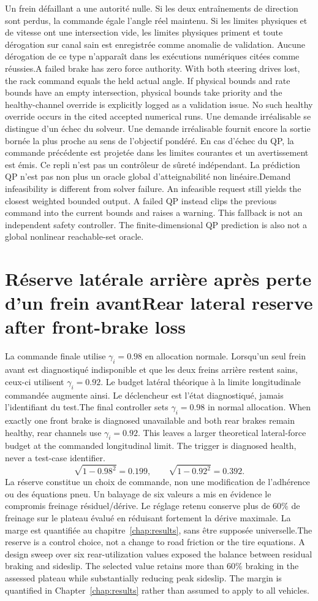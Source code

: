 \documentclass[11pt,a4paper,oneside]{report}
\newcommand{\bi}[2]{\iffrench #2\else #1\fi}
\renewcommand{\sec}[2]{\section{\bi{#1}{#2}}}
\begin{document}
\bi{A failed brake has zero force authority. With both steering drives lost, the rack command equals the held actual angle. If physical bounds and rate bounds have an empty intersection, physical bounds take priority and the healthy-channel override is explicitly logged as a validation issue. No such healthy override occurs in the cited accepted numerical runs.}{Un frein défaillant a une autorité nulle. Si les deux entraînements de direction sont perdus, la commande égale l'angle réel maintenu. Si les limites physiques et de vitesse ont une intersection vide, les limites physiques priment et toute dérogation sur canal sain est enregistrée comme anomalie de validation. Aucune dérogation de ce type n'apparaît dans les exécutions numériques citées comme réussies.}
\bi{Demand infeasibility is different from solver failure. An infeasible request still yields the closest weighted bounded output. A failed QP instead clips the previous command into the current bounds and raises a warning. This fallback is not an independent safety controller. The finite-dimensional QP prediction is also not a global nonlinear reachable-set oracle.}{Une demande irréalisable se distingue d'un échec du solveur. Une demande irréalisable fournit encore la sortie bornée la plus proche au sens de l'objectif pondéré. En cas d'échec du QP, la commande précédente est projetée dans les limites courantes et un avertissement est émis. Ce repli n'est pas un contrôleur de sûreté indépendant. La prédiction QP n'est pas non plus un oracle global d'atteignabilité non linéaire.}

\sec{Rear lateral reserve after front-brake loss}{Réserve latérale arrière après perte d'un frein avant}
\bi{The final controller sets $\gamma_i=0.98$ in normal allocation. When exactly one front brake is diagnosed unavailable and both rear brakes remain healthy, rear channels use $\gamma_i=0.92$. This leaves a larger theoretical lateral-force budget at the commanded longitudinal limit. The trigger is diagnosed health, never a test-case identifier.}{La commande finale utilise $\gamma_i=0.98$ en allocation normale. Lorsqu'un seul frein avant est diagnostiqué indisponible et que les deux freins arrière restent sains, ceux-ci utilisent $\gamma_i=0.92$. Le budget latéral théorique à la limite longitudinale commandée augmente ainsi. Le déclencheur est l'état diagnostiqué, jamais l'identifiant du test.}
\[
\sqrt{1-0.98^2}=0.199,\qquad \sqrt{1-0.92^2}=0.392.
\]
\bi{The reserve is a control choice, not a change to road friction or the tire equations. A design sweep over six rear-utilization values exposed the balance between residual braking and sideslip. The selected value retains more than 60\% braking in the assessed plateau while substantially reducing peak sideslip. The margin is quantified in Chapter~\ref{chap:results} rather than assumed to apply to all vehicles.}{La réserve constitue un choix de commande, non une modification de l'adhérence ou des équations pneu. Un balayage de six valeurs a mis en évidence le compromis freinage résiduel/dérive. Le réglage retenu conserve plus de 60\% de freinage sur le plateau évalué en réduisant fortement la dérive maximale. La marge est quantifiée au chapitre~\ref{chap:results}, sans être supposée universelle.}
\end{document}
